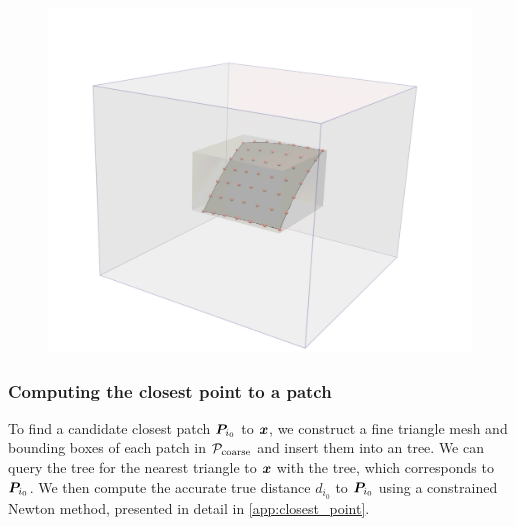 \begin{figure}[!htb]
\begin{minipage}{.33\textwidth}
  \end{minipage}\hfill
  \begin{minipage}{.33\textwidth}
    \includegraphics[width=\linewidth]{figs/patch_with_coeffs_near_bbox.png}
  \end{minipage}\hfill
\end{figure}



\subsubsection{Computing the closest point to a patch\label{sec:closest_point_algo}}

To find a candidate closest patch ${\bm{P}}_{i_0}$ to ${\bm{x}}$, we construct a fine triangle mesh and bounding boxes of each patch in ${\mathcal{P}_{\mathrm{coarse}}}$ and insert them into an \aabb tree.
We can query the \aabb tree for the nearest triangle to ${\bm{x}}$ with the \aabb tree, which corresponds to ${\bm{P}}_{i_0}$.
We then compute the accurate true distance $d_{i_0}$ to ${\bm{P}}_{i_0}$ using a constrained Newton method, presented in detail in \cref{app:closest_point}.

